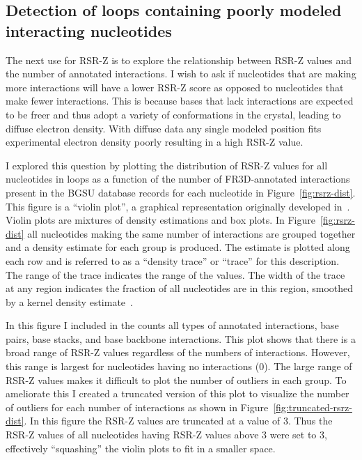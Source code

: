 \subsection{Detection of loops containing poorly modeled interacting nucleotides}

The next use for RSR-Z is to explore the relationship between RSR-Z values and
the number of annotated interactions. I wish to ask if nucleotides that are
making more interactions will have a lower RSR-Z score as opposed to nucleotides
that make fewer interactions. This is because bases that lack interactions are
expected to be freer and thus adopt a variety of conformations in the crystal,
leading to diffuse electron density. With diffuse data any single modeled
position fits experimental electron density poorly resulting in a high RSR-Z
value.

I explored this question by plotting the distribution of RSR-Z values for all
nucleotides in loops as a function of the number of FR3D-annotated interactions
present in the BGSU database records for each nucleotide in
Figure~\ref{fig:rsrz-dist}. This figure is a ``violin plot'', a graphical
representation originally developed in~\cite{Hintze1998}. Violin plots are
mixtures of density estimations and box plots. In Figure~\ref{fig:rsrz-dist} all
nucleotides making the same number of interactions are grouped together and a
density estimate for each group is produced. The estimate is plotted along each
row and is referred to as a ``density trace'' or ``trace'' for this description.
The range of the trace indicates the range of the values. The width of the trace
at any region indicates the fraction of all nucleotides are in this region,
smoothed by a kernel density estimate~\cite{Hintze1998}.

In this figure I included in the counts all types of annotated interactions,
base pairs, base stacks, and base backbone interactions. This plot shows that
there is a broad range of RSR-Z values regardless of the numbers of
interactions. However, this range is largest for nucleotides having no
interactions (0). The large range of RSR-Z values makes it difficult to plot the
number of outliers in each group. To ameliorate this I created a truncated
version of this plot to visualize the number of outliers for each number of
interactions as shown in Figure~\ref{fig:truncated-rsrz-dist}. In this figure
the RSR-Z values are truncated at a value of 3. Thus the RSR-Z values of all
nucleotides having RSR-Z values above 3 were set to 3, effectively ``squashing''
the violin plots to fit in a smaller space.

